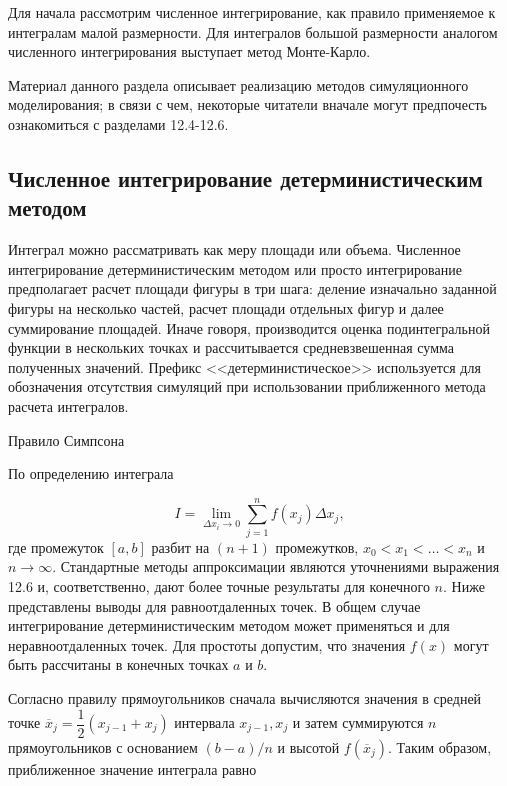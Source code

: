 Для начала рассмотрим численное интегрирование, как правило применяемое к интегралам малой размерности. Для интегралов большой размерности аналогом численного интегрирования выступает метод Монте-Карло.

Материал данного раздела описывает реализацию методов симуляционного моделирования; в связи с чем, некоторые читатели вначале могут предпочесть ознакомиться с разделами 12.4-12.6.

\subsection{Численное интегрирование детерминистическим методом}

Интеграл можно рассматривать как меру площади или объема. Численное интегрирование детерминистическим методом или просто интегрирование предполагает расчет площади фигуры в три шага: деление изначально заданной фигуры на несколько частей, расчет площади отдельных фигур и далее суммирование площадей. Иначе говоря, производится оценка подинтегральной функции в нескольких точках и рассчитывается средневзвешенная сумма полученных значений. Префикс <<детерминистическое>> используется для обозначения отсутствия симуляций при использовании приближенного метода расчета интегралов.

\begin{center}
Правило Симпсона
\end{center}

По определению интеграла 

\begin{equation}
I=\lim_{\Delta{x_i} \rightarrow 0}\sum^{n}_{j=1}f(x_j)\Delta{x_j},
\end{equation}
где промежуток $[a,b]$ разбит на $(n+1)$ промежутков, $x_{0}<x_{1}<\ldots <x_{n}$ и $n \rightarrow \infty$. Стандартные методы аппроксимации являются уточнениями выражения  12.6 и, соответственно, дают более точные результаты для конечного $n$. Ниже представлены выводы для равноотдаленных точек. В общем случае интегрирование детерминистическим методом может применяться и для неравноотдаленных точек. Для простоты допустим, что значения $f(x)$ могут быть рассчитаны в конечных точках $a$ и $b$. 

Согласно правилу прямоугольников сначала вычисляются значения в средней точке $\overline{x}_{j}=\dfrac{1}{2}(x_{j-1}+x_j)$ интервала $x_{j-1},x_j$ и затем суммируются $n$ прямоугольников с основанием $(b-a)/n$ и высотой $f(\overline{x}_j)$. Таким образом, приближенное значение интеграла равно 

